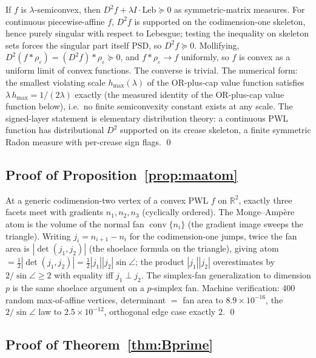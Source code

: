 \documentclass[11pt,a4paper]{article}
\theoremstyle{plain}
\theoremstyle{definition}
\theoremstyle{remark}
\newcommand{\RR}{\mathbb{R}}
\begin{document}
If $f$ is $\lambda$-semiconvex, then $D^2 f + \lambda I \cdot
\mathrm{Leb} \succeq 0$ as symmetric-matrix measures. For continuous
piecewise-affine $f$, $D^2 f$ is supported on the codimension-one
skeleton, hence purely singular with respect to Lebesgue; testing
the inequality on skeleton sets forces the singular part itself
PSD, so $D^2 f \succeq 0$. Mollifying, $D^2(f * \rho_\varepsilon)
= (D^2 f) * \rho_\varepsilon \succeq 0$, and $f * \rho_\varepsilon
\to f$ uniformly, so $f$ is convex as a uniform limit of convex
functions. The converse is trivial. The numerical form: the
smallest violating scale $h_{\max}(\lambda)$ of the OR-plus-cap
value function satisfies $\lambda\,h_{\max} = 1/(2\lambda)$
exactly (the measured identity of the OR-plus-cap
value function below), i.e.\ no finite semiconvexity constant exists at
any scale. The signed-layer statement is elementary distribution
theory: a continuous PWL function has distributional $D^2$
supported on its crease skeleton, a finite symmetric Radon measure
with per-crease sign flags. \qed

\subsection{Proof of Proposition~\ref{prop:maatom}}

At a generic codimension-two vertex of a convex PWL $f$ on
$\RR^2$, exactly three facets meet with gradients $n_1, n_2, n_3$
(cyclically ordered). The Monge--Amp\`ere atom is the volume of
the normal fan $\operatorname{conv}\{n_i\}$ (the gradient image
sweeps the triangle). Writing $j_i = n_{i+1} - n_i$ for the
codimension-one jumps, twice the fan area is $|\det(j_1, j_2)|$
(the shoelace formula on the triangle), giving atom $=
\tfrac12|\det(j_1, j_2)| = \tfrac12 |j_1||j_2| \sin\angle$; the
product $|j_1||j_2|$ overestimates by $2/\sin\angle \ge 2$ with
equality iff $j_1 \perp j_2$. The simplex-fan generalization to
dimension $p$ is the same shoelace argument on a $p$-simplex fan.
Machine verification: 400 random max-of-affine vertices,
determinant $=$ fan area to $8.9 \times 10^{-16}$, the
$2/\sin\angle$ law to $2.5 \times 10^{-12}$, orthogonal edge case
exactly $2$. \qed

\subsection{Proof of Theorem~\ref{thm:Bprime}}
\end{document}
